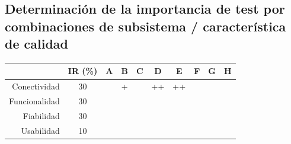 \documentclass[
    11pt,
    spanish,
	a4paper
]{article}
\begin{document}
\subsection{Determinación de la importancia de test por combinaciones de subsistema / característica de calidad}
\label{sub:combinacion}

\begin{table}[H]
\centering
\begin{tabular}{r|ccccccccc}
    & IR (\%) & A & B & C & D & E & F & G & H \\ \hline
    Conectividad  & 30 &    & +  &    & ++ & ++ &    &    &    \\
    Funcionalidad & 30 &    &    &    &    &    &    &    &    \\
    Fiabilidad    & 30 &    &    &    &    &    &    &    &    \\
    Usabilidad    & 10 &    &    &    &    &    &    &    &    \\
\end{tabular}
\end{table}
\end{document}
